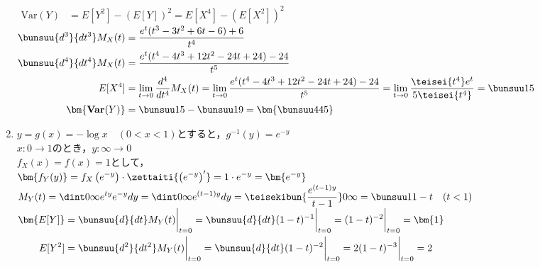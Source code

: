 \documentclass[b5paper]{jlreq}  %
\begin{document}
\begin{enumerate}[(1)\hspace{5mm}]
    $\begin{aligned}
        \text{Var}(Y)&=E\left[Y^2\right]-\left(E[Y]\right)^2=E\left[X^4\right]-\left(E[X^2]\right)^2
    \end{aligned}$\\



    
    $\begin{aligned}
        \bunsuu{d^3}{dt^3}M_X(t)&
        =\dfrac{e^t(t^3-3t^2+6t-6)+6}{t^4}\\
        \bunsuu{d^4}{dt^4}M_X(t)&
        =\dfrac{e^t(t^4-4t^3+12t^2-24t+24)-24}{t^5}\\
        E[X^4]&=\lim_{t\to0}\dfrac{d^4}{dt^4}M_X(t)
        =\lim_{t\to0}\dfrac{e^t(t^4-4t^3+12t^2-24t+24)-24}{t^5}
        =\lim_{t\to0}\dfrac{\teisei{t^4}e^t}{5\teisei{t^4}}
        =\bunsuu15\\
        \bm{\textbf{Var}(Y)}&=\bunsuu15-\bunsuu19=\bm{\bunsuu4{45}}
    \end{aligned}$


\newpage

    \item $y=g(x)=-\log x\quad(0<x<1)$とすると，$g^{-1}(y)=e^{-y}$\\
    
    $x:0\to 1$のとき，$y:\infty\to 0$\\
    
    $f_X(x)=f(x)=1$として，\\

    $\begin{aligned}
        \bm{f_Y(y)}&=f_X\left(e^{-y}\right)\cdot\zettaiti{\left(e^{-y}\right)'}
        =1\cdot e^{-y}=\bm{e^{-y}}\end{aligned}$\\
    
    
    $\begin{aligned}
        M_Y(t)&
        =\dint0\infty e^{ty}e^{-y}dy
        =\dint0\infty e^{(t-1)y}dy
        =\teisekibun{\dfrac{e^{(t-1)y}}{t-1}}0\infty
        =\bunsuu1{1-t}\quad (t<1)\end{aligned}$\\
    
     
    
    $\begin{aligned}
        \bm{E[Y]}&=\bunsuu{d}{dt}M_Y(t)\bigg|_{t=0}=\bunsuu{d}{dt}(1-t)^{-1}\bigg|_{t=0}
        =(1-t)^{-2}\bigg|_{t=0}=\bm{1}\\
        E[Y^2]&=\bunsuu{d^2}{dt^2}M_Y(t)\bigg|_{t=0}=\bunsuu{d}{dt}(1-t)^{-2}\bigg|_{t=0}
        =2(1-t)^{-3}\bigg|_{t=0}=2
    \end{aligned}$\\



\end{enumerate}
\end{document}
